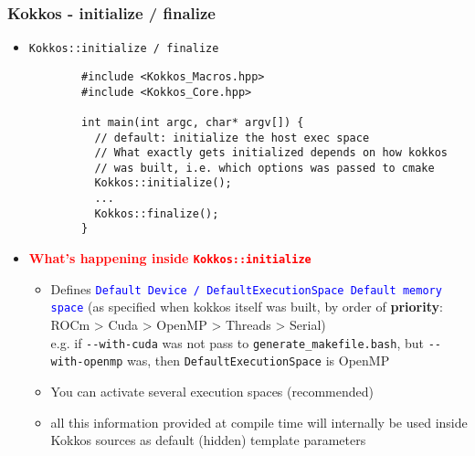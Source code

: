 
\begin{frame}[fragile=singleslide]
  \frametitle{Kokkos - initialize / finalize}

  \begin{itemize}
  \item \texttt{Kokkos::initialize / finalize}
    {\small\begin{verbatim}
        #include <Kokkos_Macros.hpp>
        #include <Kokkos_Core.hpp>

        int main(int argc, char* argv[]) {
          // default: initialize the host exec space
          // What exactly gets initialized depends on how kokkos
          // was built, i.e. which options was passed to cmake
          Kokkos::initialize();
          ...
          Kokkos::finalize();
        }
      \end{verbatim}
    }
  \item \textcolor{red}{\textbf{What's happening inside \texttt{Kokkos::initialize}}}
    \begin{itemize}
    \item Defines \textcolor{blue}{\texttt{Default Device / DefaultExecutionSpace Default memory space}} (as specified when kokkos itself was built, by order of {\bf priority}: ROCm > Cuda > OpenMP > Threads > Serial)\\
      e.g. if \texttt{\--\--with-cuda} was not pass to \texttt{generate\_makefile.bash}, but \texttt{\--\--with-openmp} was, then \texttt{DefaultExecutionSpace} is OpenMP
    \item You can activate several execution spaces (recommended)
    \item all this information provided at compile time will internally be used inside Kokkos sources as default (hidden) template parameters
    \end{itemize}
  \end{itemize}
\end{frame}

